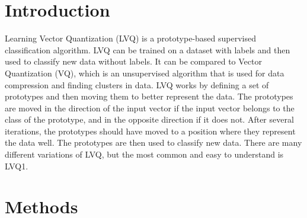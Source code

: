 \documentclass[twoside, a4paper, fleqn, reqno]{article}
\begin{document}
\maketitle

\section*{Introduction}
Learning Vector Quantization (LVQ) is a prototype-based supervised classification algorithm.
LVQ can be trained on a dataset with labels and then used to classify new data without labels.
It can be compared to Vector Quantization (VQ), which is an unsupervised algorithm
that is used for data compression and finding clusters in data. LVQ works by
defining a set of prototypes and then moving them to better represent the data.
The prototypes are moved in the direction of the input vector if the input vector
belongs to the class of the prototype, and in the opposite direction if it does not.
After several iterations, the prototypes should have moved to a position where
they represent the data well. The prototypes are then used to classify new data.
There are many different variations of LVQ, but the most common and easy to understand is LVQ1.

\section*{Methods}
\end{document}
